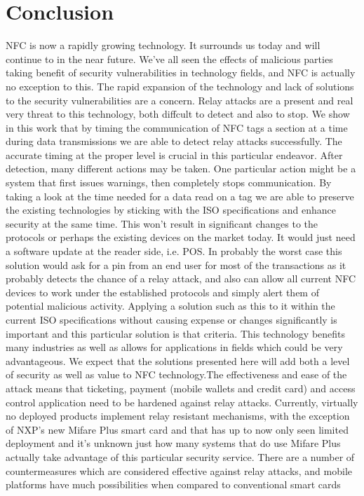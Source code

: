 \documentclass[conference]{IEEEtran}
\begin{document}
\section{Conclusion}
NFC is now a rapidly growing technology. It surrounds us today and will
continue to in the near future. We've all seen the effects of malicious parties taking
benefit of security vulnerabilities in technology fields, and NFC is actually no exception to this. The rapid expansion of the technology and lack of solutions to the security
vulnerabilities are a concern. Relay attacks are a present and real very threat to this
technology, both diffcult to detect and also to stop.
We show in this work that by timing the communication of NFC tags a section at a time during data transmissions we are able to detect relay attacks successfully. The accurate
timing at the proper level is crucial in this particular endeavor. After detection, many different
actions may be taken. One particular action might be a system that first issues warnings,
then completely stops communication.
By taking a look at the time needed for a data read on a tag we are able to preserve the
existing technologies by sticking with the ISO specifications and enhance security at the same time. This won't result in significant changes to the protocols or perhaps the existing
devices on the market today. It would just need a software update at the reader side, i.e. POS. In probably the worst case this solution would ask for a pin from an end user for most of the transactions as it probably detects the chance of a relay attack, and also can allow all current NFC
devices to work under the established protocols and simply alert them of potential malicious activity. Applying a solution such as this to it within the current
ISO specifications without causing expense or changes significantly is important and this particular solution is that criteria.
This technology benefits many industries as well as allows for applications in fields which could be very advantageous. We expect that the solutions presented
here will add both a level of security as well as value to NFC technology.The effectiveness and ease of the attack means that
ticketing, payment (mobile wallets and credit card) and
access control application need to be hardened against relay attacks. Currently, virtually no deployed products
implement relay resistant mechanisms, with the exception
of NXP's new Mifare Plus smart card and that has
up to now only seen limited deployment and it's unknown
just how many systems that do use Mifare Plus actually take advantage of this particular security service. There are
a number of countermeasures which are considered
effective against relay attacks, and mobile platforms
have much possibilities when compared to conventional
smart cards
\end{document}
